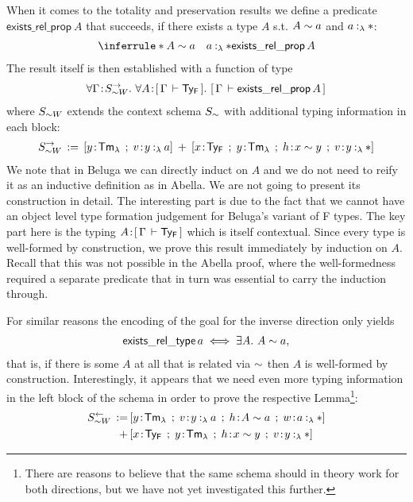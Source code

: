 When it comes to the totality and preservation results we define a predicate $\mathsf{exists\_rel\_prop}~A$ that succeeds, if there exists a type $A$ s.t. $A \mathrel{\sim} a$ and $\typingLh{a}{\Prp}$: 
\begin{align*}
\inferrule*{A \tyr a \quad \typingLh{a}{\Prp}}{ \mathsf{exists\_rel\_prop}\,A}
\end{align*}
The result itself is then established with a function of type
\begin{align*}
  \forall \Gamma \!:\! S_{\mathrel{\sim} W}^{\rightarrow}.\,\, \forall A \!:\! [\,\Gamma\,\vdash \mathsf{Ty_{F}}\,].\,\, [\,\Gamma\,\vdash \mathsf{exists\_rel\_prop}\,A\,]
\end{align*}
where $S_{\mathrel{\sim} W}$ extends the context schema $S_{\mathrel{\sim}}$ with additional typing information in each block:
\begin{align*}
  S_{\tyr W}^{\rightarrow} \eqdef [y\of\TmL \mrel{;} v\of\typingLh{y}{a}] \mrel{+} [x\of\TyF \mrel{;} y\of\TmL \mrel{;} h\of x \tyr y \mrel{;} v\of\typingLh{y}{\Prp}]
\end{align*}
%
We note that in Beluga we can directly induct on $A$ and we do not need to reify it as an inductive definition as in Abella. We are not going to present its construction in detail.
The interesting part is due to the fact that we cannot have an object level type formation judgement for Beluga's variant of F types.
The key part here is the typing $A \!:\! [\,\Gamma\,\vdash \mathsf{Ty_{F}}\,]$ which is itself contextual.
Since every type is well-formed by construction, we prove this result immediately by induction on $A$.
Recall that this was not possible in the Abella proof, where the well-formedness required a separate predicate that in turn was essential to carry the induction through.

For similar reasons the encoding of the goal for the inverse direction only yields
\begin{align*}
  \mathsf{exists\_rel\_type}\,a \iff \exists A.\,\, A \mathrel{\sim} a,
\end{align*}
that is, if there is some $A$ at all that is related via $\mathrel{\sim}$ then $A$ is well-formed by construction.
Interestingly, it appears that we need even more typing information in the left block of the schema in order to prove the respective Lemma\footnote{There are reasons to believe that the same schema should  in theory work for both directions, but we have not yet investigated this further.}:
\begin{align*}
  S_{\tyr W}^{\leftarrow} \eqdef &[y\of\TmL \mrel{;} v\of\typingLh{y}{a} \mrel{;} h\of A \tyr a \mrel{;} w \of \typingLh{a}{\Prp}]\\
  \mrel{+} &[x\of\TyF \mrel{;} y\of\TmL \mrel{;} h\of x \tyr y \mrel{;} v\of\typingLh{y}{\Prp}]
\end{align*}


